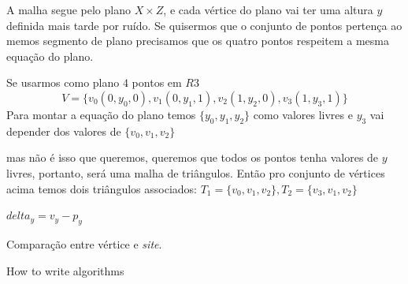 A malha segue pelo plano $X \times Z$, e cada vértice do plano vai ter uma altura
$y$ definida mais tarde por ruído. Se quisermos que o conjunto de pontos pertença
ao memos segmento de plano precisamos que os quatro pontos respeitem a mesma
equação do plano.

Se usarmos como plano $4$ pontos em $R3$
\begin{equation}\label{comp_sign_inter_sem_peso_aux}
    V = \{v_{0}(0, y_{0}, 0), v_{1}(0, y_{1}, 1), v_{2}(1, y_{2}, 0), v_{3}(1, y_{3}, 1)\}
\end{equation}
Para montar a equação do plano temos $\{y_{0}, y_{1}, y_{2}\}$ como valores livres e $y_{3}$
vai depender dos valores de $\{v_{0}, v_{1}, v_{2}\}$


mas não é isso que queremos, queremos que todos os pontos tenha valores de $y$
livres, portanto, será uma malha de triângulos. Então pro conjunto de vértices
acima temos dois triângulos associados:
$T_{1} = \{v_{0}, v_{1}, v_{2}\}, T_{2} = \{v_{3}, v_{1}, v_{2}\}$

\begin{algorithm}[H]\label{comp_vertice_site}
  $delta_{y} = v_{y} - p_{y}$ \\
  \caption{Comparação entre vértice e \textit{site}.}
\end{algorithm}

\begin{algorithm}[H] %
 \caption{How to write algorithms}
     \SetAlgoLined


\end{algorithm}

%






